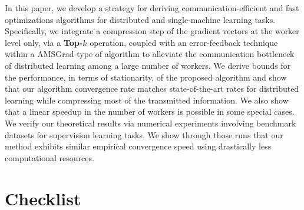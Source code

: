 \documentclass[11pt]{article}
\begin{document}
In this paper, we develop a strategy for deriving communication-efficient and fast optimizations algorithms for distributed and single-machine learning tasks. 
Specifically, we integrate a compression step of the gradient vectors at the worker level only, via a \textbf{Top-$k$} operation, coupled with an error-feedback technique within a AMSGrad-type of algorithm to alleviate the communication bottleneck of distributed learning among a large number of workers.
We derive bounds for the performance, in terms of stationarity, of the proposed algorithm and show that our algorithm convergence rate matches state-of-the-art rates for distributed learning while compressing most of the transmitted information. 
We also show that a linear speedup in the number of workers is possible in some special cases.
We verify our theoretical results via numerical experiments involving benchmark datasets for supervision learning tasks.
We show through those runs that our method exhibits similar empirical convergence speed using drastically less computational resources.


\newpage




\clearpage 

\section*{Checklist}
\end{document}
